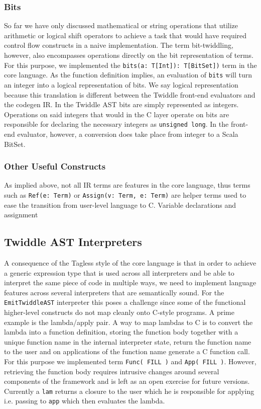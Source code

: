 \documentclass{article}
\begin{document}
\subsubsection{Bits}
So far we have only discussed mathematical or string operations that utilize arithmetic or logical shift operators to achieve a task that would have required control flow constructs in a naive implementation. The term bit-twiddling, however, also encompasses operations directly on the bit representation of terms. For this purpose, we implemented the \texttt{bits(a: T[Int]): T[BitSet])} term in the core language. As the function definition implies, an evaluation of \texttt{bits} will turn an integer into a logical representation of bits. We say logical representation because this translation is different between the Twiddle front-end evaluators and the codegen IR. In the Twiddle AST bits are simply represented as integers. Operations on said integers that would in the C layer operate on bits are responsible for declaring the necessary integers as \texttt{unsigned long}. In the front-end evaluator, however, a conversion does take place from integer to a Scala BitSet.

\subsubsection{Other Useful Constructs}
As implied above, not all IR terms are features in the core language, thus terms such as \texttt{Ref(e: Term)} or \texttt{Assign(v: Term, e: Term)} are helper terms used to ease the transition from user-level language to C.
Variable declarations and assignment

\subsection{Twiddle AST Interpreters}\label{subsec:ast_interpreter}
A consequence of the Tagless style of the core language is that in order to achieve a generic expression type that is used across all interpreters and be able to interpret the same piece of code in multiple ways, we need to implement language features across several interpreters that are semantically sound. For the \texttt{EmitTwiddleAST} interpreter this poses a challenge since some of the functional higher-level constructs do not map cleanly onto C-style programs. A prime example is the lambda/apply pair. A way to map lambdas to C is to convert the lambda into a function definition, storing the function body together with a unique function name in the internal interpreter state, return the function name to the user and on applications of the function name generate a C function call. For this purpose we implemented term \texttt{Func( FILL )} and \texttt{App( FILL )}. However, retrieving the function body requires intrusive changes around several components of the framework and is left as an open exercise for future versions. Currently a \texttt{lam} returns a closure to the user which he is responsible for applying i.e. passing to \texttt{app} which then evaluates the lambda.
\end{document}
